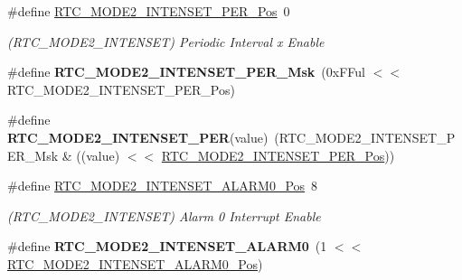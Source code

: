 \begin{DoxyCompactItemize}
\item 
\hypertarget{group___s_a_m_l21___r_t_c_gac19f6fd88adb82ff77b61ee30f206f99}{}\#define \hyperlink{group___s_a_m_l21___r_t_c_gac19f6fd88adb82ff77b61ee30f206f99}{R\+T\+C\+\_\+\+M\+O\+D\+E2\+\_\+\+I\+N\+T\+E\+N\+S\+E\+T\+\_\+\+P\+E\+R\+\_\+\+Pos}~0\label{group___s_a_m_l21___r_t_c_gac19f6fd88adb82ff77b61ee30f206f99}

\begin{DoxyCompactList}\small\item\em (R\+T\+C\+\_\+\+M\+O\+D\+E2\+\_\+\+I\+N\+T\+E\+N\+S\+E\+T) Periodic Interval x Enable \end{DoxyCompactList}\item 
\hypertarget{group___s_a_m_l21___r_t_c_ga9ca67c1f0cb067904f55a4a2e4f411da}{}\#define {\bfseries R\+T\+C\+\_\+\+M\+O\+D\+E2\+\_\+\+I\+N\+T\+E\+N\+S\+E\+T\+\_\+\+P\+E\+R\+\_\+\+Msk}~(0x\+F\+Ful $<$$<$ R\+T\+C\+\_\+\+M\+O\+D\+E2\+\_\+\+I\+N\+T\+E\+N\+S\+E\+T\+\_\+\+P\+E\+R\+\_\+\+Pos)\label{group___s_a_m_l21___r_t_c_ga9ca67c1f0cb067904f55a4a2e4f411da}

\item 
\hypertarget{group___s_a_m_l21___r_t_c_ga9fbe75f7a1ef062f64d5aaa9395ab372}{}\#define {\bfseries R\+T\+C\+\_\+\+M\+O\+D\+E2\+\_\+\+I\+N\+T\+E\+N\+S\+E\+T\+\_\+\+P\+E\+R}(value)~(R\+T\+C\+\_\+\+M\+O\+D\+E2\+\_\+\+I\+N\+T\+E\+N\+S\+E\+T\+\_\+\+P\+E\+R\+\_\+\+Msk \& ((value) $<$$<$ \hyperlink{group___s_a_m_l21___r_t_c_gac19f6fd88adb82ff77b61ee30f206f99}{R\+T\+C\+\_\+\+M\+O\+D\+E2\+\_\+\+I\+N\+T\+E\+N\+S\+E\+T\+\_\+\+P\+E\+R\+\_\+\+Pos}))\label{group___s_a_m_l21___r_t_c_ga9fbe75f7a1ef062f64d5aaa9395ab372}

\item 
\hypertarget{group___s_a_m_l21___r_t_c_gae3e5321c878d7379527cce856008f7fb}{}\#define \hyperlink{group___s_a_m_l21___r_t_c_gae3e5321c878d7379527cce856008f7fb}{R\+T\+C\+\_\+\+M\+O\+D\+E2\+\_\+\+I\+N\+T\+E\+N\+S\+E\+T\+\_\+\+A\+L\+A\+R\+M0\+\_\+\+Pos}~8\label{group___s_a_m_l21___r_t_c_gae3e5321c878d7379527cce856008f7fb}

\begin{DoxyCompactList}\small\item\em (R\+T\+C\+\_\+\+M\+O\+D\+E2\+\_\+\+I\+N\+T\+E\+N\+S\+E\+T) Alarm 0 Interrupt Enable \end{DoxyCompactList}\item 
\hypertarget{group___s_a_m_l21___r_t_c_ga1f86100154785b908e724d0f323d79ee}{}\#define {\bfseries R\+T\+C\+\_\+\+M\+O\+D\+E2\+\_\+\+I\+N\+T\+E\+N\+S\+E\+T\+\_\+\+A\+L\+A\+R\+M0}~(1 $<$$<$ \hyperlink{group___s_a_m_l21___r_t_c_gae3e5321c878d7379527cce856008f7fb}{R\+T\+C\+\_\+\+M\+O\+D\+E2\+\_\+\+I\+N\+T\+E\+N\+S\+E\+T\+\_\+\+A\+L\+A\+R\+M0\+\_\+\+Pos})\label{group___s_a_m_l21___r_t_c_ga1f86100154785b908e724d0f323d79ee}


\end{DoxyCompactItemize}
